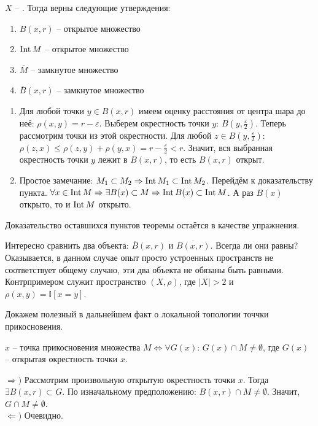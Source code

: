 \begin{Theorem} \label{thm:thm_1_3}
    $X$ -- \MS. Тогда верны следующие утверждения:
    \begin{enumerate}
        \item $B(x, r)$ -- открытое множество
        \item $\operatorname{Int} M$ -- открытое множество
        \item $\overline{M}$ -- замкнутое множество
        \item $\overline{B}(x, r)$ -- замкнутое множество
    \end{enumerate}
\end{Theorem}
\begin{Proof}
    \begin{enumerate}
        \item Для любой точки $y \in B(x, r)$ имеем оценку расстояния от центра шара до неё: $\rho(x, y) = r - \varepsilon$. Выберем окрестность точки $y$: $B(y, \frac{\varepsilon}{2})$.
        Теперь рассмотрим точки из этой окрестности. Для любой $z \in B(y, \frac{\varepsilon}{2})$: $\rho(z, x) \leq \rho(z, y) + \rho(y, x) = r - \frac{\varepsilon}{2} < r$. Значит, вся выбранная окрестность 
        точки $y$ лежит в $B(x, r)$, то есть $B(x, r)$ открыт.
        
        \item Простое замечание: $M_1 \subset M_2 \Rightarrow \operatorname{Int} M_1 \subset \operatorname{Int} M_2$. Перейдём к доказательству пункта. $\forall x \in \operatorname{Int} M \Rightarrow \exists B(x) \subset M \Rightarrow \operatorname{Int} B(x) \subset \operatorname{Int} M $. 
        А раз $B(x)$ открыто, то и $\operatorname{Int} M$ открыто.
    \end{enumerate}
    Доказательство оставшихся пунктов теоремы остаётся в качестве упражнения.
\end{Proof}

\vspace{0.5cm}

Интересно сравнить два объекта: $\overline{B}(x, r)$ и $\overline{B(x, r)}$. Всегда ли они равны? Оказывается, в данном случае опыт просто устроенных пространств не соответствует общему случаю,
эти два объекта не обязаны быть равными. Контрпримером служит пространство $(X, \rho)$, где $|X| > 2$ и $\rho(x, y) = \mathbb{I}[x=y]$.

\vspace{0.5cm}

Докажем полезный в дальнейшем факт о локальной топологии точчки прикосновения.

\begin{Statement}
    $x$ -- точка прикосновения множества $M \Longleftrightarrow \forall G(x): \, G(x) \cap M \neq \emptyset$, где $G(x)$ -- открытая окрестность точки $x$.
\end{Statement}
\begin{Proof}
    $\Rightarrow)$ Рассмотрим произвольную открытую окрестность точки $x$. Тогда $\exists B(x, r) \subset G$. По изначальному предположению: $B(x, r) \cap M \neq \emptyset$. Значит, $G \cap M \neq \emptyset$.
    \\
    $\Leftarrow)$ Очевидно.
\end{Proof}